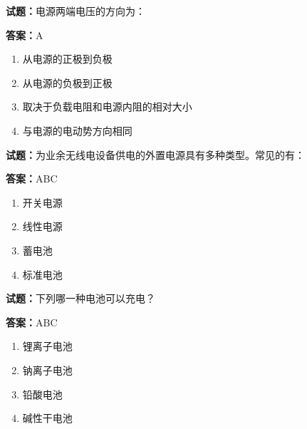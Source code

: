 \documentclass{ctexbook}
\begin{document}




\vspace{1em}

\textbf{试题：}电源两端电压的方向为： 

\textbf{答案：}A 


\begin{enumerate}[leftmargin=3em]
  \item 从电源的正极到负极 

  \item 从电源的负极到正极 

  \item 取决于负载电阻和电源内阻的相对大小 

  \item 与电源的电动势方向相同 

\end{enumerate}





\vspace{1em}

\textbf{试题：}为业余无线电设备供电的外置电源具有多种类型。常见的有： 

\textbf{答案：}ABC 

\begin{enumerate}[leftmargin=3em]
  \item 开关电源 

  \item 线性电源 

  \item 蓄电池 

  \item 标准电池 

\end{enumerate}





\vspace{1em}

\textbf{试题：}下列哪一种电池可以充电？ 

\textbf{答案：}ABC 

\begin{enumerate}[leftmargin=3em]
  \item 锂离子电池 

  \item 钠离子电池 

  \item 铅酸电池 

  \item 碱性干电池 

\end{enumerate}
\end{document}
